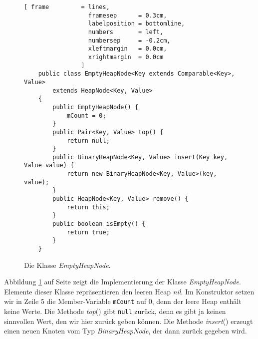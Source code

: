 \begin{figure}[!h]
  \centering
\begin{Verbatim}[ frame         = lines, 
                  framesep      = 0.3cm, 
                  labelposition = bottomline,
                  numbers       = left,
                  numbersep     = -0.2cm,
                  xleftmargin   = 0.0cm,
                  xrightmargin  = 0.0cm
                ]
    public class EmptyHeapNode<Key extends Comparable<Key>, Value> 
        extends HeapNode<Key, Value>
    {
        public EmptyHeapNode() {
            mCount = 0;
        }    
        public Pair<Key, Value> top() {
            return null;
        }
        public BinaryHeapNode<Key, Value> insert(Key key, Value value) {
            return new BinaryHeapNode<Key, Value>(key, value);
        }        
        public HeapNode<Key, Value> remove() {
            return this;
        }
        public boolean isEmpty() {
            return true;
        }
    }
\end{Verbatim}
\vspace*{-0.3cm}
  \caption{Die Klasse \textsl{EmptyHeapNode}.}
  \label{fig:EmptyHeapNode}
\end{figure}

Abbildung \ref{fig:EmptyHeapNode} auf Seite \pageref{fig:EmptyHeapNode} zeigt die
Implementierung der Klasse \textsl{EmptyHeapNode}.  Elemente dieser Klasse repr\"asentieren
den leeren Heap \textsl{nil}.  Im Konstruktor setzen wir in Zeile 5 die Member-Variable
\texttt{mCount} auf 0, denn der leere Heap enth\"alt keine Werte. Die Methode \textsl{top}()
gibt \texttt{null} zur\"uck, denn es gibt ja keinen sinnvollen Wert, den wir hier zur\"uck
geben k\"onnen.   Die Methode \textsl{insert}() erzeugt einen neuen Knoten vom Typ
\textsl{BinaryHeapNode}, der dann zur\"uck gegeben wird. 


